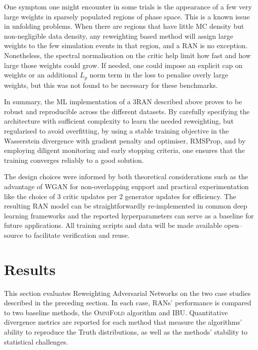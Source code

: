 {{        One symptom one might encounter in some trials is the appearance of a few very large weights in sparsely populated regions of phase space.
        This is a known issue in unfolding problems.
        When there are regions that have little MC density but non-negligible data density, any reweighting based method will assign large weights to the few simulation events in that region, and a RAN is no exception.
        Nonetheless, the spectral normalisation on the critic help limit how fast and how large those weights could grow.
        If needed, one could impose an explicit cap on weights or an additional \(L_p\) norm term in the loss to penalise overly large weights, but this was not found to be necessary for these benchmarks.

    In summary, the ML implementation of a 3RAN described above proves to be robust and reproducible across the different datasets.
    By carefully specifying the architecture with sufficient complexity to learn the needed reweighting, but regularised to avoid overfitting, by using a stable training objective in the Wasserstein divergence with gradient penalty and optimiser, RMSProp, and by employing diligent monitoring and early stopping criteria, one ensures that the training converges reliably to a good solution.
    
    The design choices were informed by both theoretical considerations such as the advantage of WGAN for non-overlapping support and practical experimentation like the choice of 3 critic updates per 2 generator updates for efficiency.
    The resulting RAN model can be straightforwardly re-implemented in common deep learning frameworks and the reported hyperparameters can serve as a baseline for future applications.
    All training scripts and data will be made available open--source to facilitate verification and reuse.

\section{Results}
    \label{sec:ran-results}
    This section evaluates Reweighting Adversarial Networks on the two case studies described in the preceding section.
    In each case, RANs' performance is compared to two baseline methods, the \textsc{OmniFold} algorithm and IBU.
    Quantitative divergence metrics are reported for each method that measure the algorithms' ability to reproduce the Truth distributions, as well as the methods’ stability to statistical challenges.

}}
